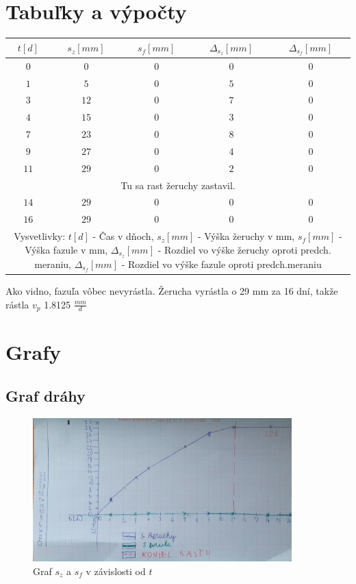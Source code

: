 \documentclass{article}
\begin{document}
\section{Tabuľky a výpočty}
\begin{center}
\begin{tabular}{|c|c|c|c|c|}
	\hline
	$t[d]$ & $s_{z}[mm]$ & $s_{f}[mm]$ & $\Delta_{s_z}[mm]$ & $\Delta_{s_f}[mm]$\\
	\hline
	$0$&$0$&$0$&$0$&$0$\\
	\hline
	$1$&$5$&$0$&$5$&$0$\\
	\hline
	$3$&$12$&$0$&$7$&$0$\\
	\hline
	$4$&$15$&$0$&$3$&$0$\\
	\hline
	$7$&$23$&$0$&$8$&$0$\\
	\hline
	$9$&$27$&$0$&$4$&$0$\\
	\hline
	$11$&$29$&$0$&$2$&$0$\\
	\hline
	\multicolumn{5}{|c|}{Tu sa rast  žeruchy zastavil.}\\
	\hline
	$14$&$29$&$0$&$0$&$0$\\
	\hline
	$16$&$29$&$0$&$0$&$0$\\
	\hline
	\multicolumn{5}{|p{12.5cm}|}{Vysvetlivky: $t[d]$ - Čas v dňoch, $s_{z}[mm]$ - Výška žeruchy v mm, $s_{f}[mm]$ - Výška fazule v mm, $\Delta_{s_z}[mm]$ - Rozdiel vo výške žeruchy oproti predch. meraniu, $\Delta_{s_f}[mm]$ - Rozdiel vo výške fazule oproti predch.meraniu}\\
	\hline
\end{tabular}
\end{center}
Ako vidno, fazuľa vôbec nevyrástla.
Žerucha vyrástla o 29 mm za 16 dní, takže rástla $v_p$ 1.8125 $\frac{mm}{d}$
\newpage
\section{Grafy}
\subsection{Graf dráhy}
	\begin{figure}[h!]
		\includegraphics[width=10cm]{graf-1.jpeg}
	\caption{Graf $s_z$ a $s_f$ v závislosti od $t$}
\end{figure}
\end{document}
